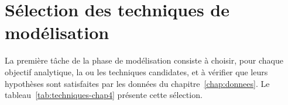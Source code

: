 \section{Sélection des techniques de modélisation}
\label{sec:selection-techniques}

La première tâche de la phase de modélisation consiste à choisir, pour chaque objectif analytique, la ou les techniques candidates, et à vérifier que leurs hypothèses sont satisfaites par les données du chapitre~\ref{chap:donnees}. Le tableau~\ref{tab:techniques-chap4} présente cette sélection.

\begingroup
\setlength{\tabcolsep}{3pt}
\renewcommand{\arraystretch}{1.15}
\small

